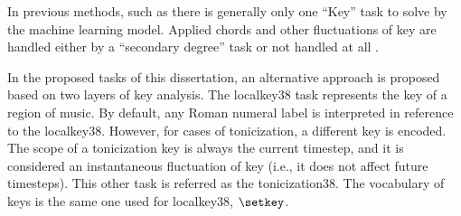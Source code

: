 
In previous methods, such as \textcite{chen2018functional,
chen2019harmony, micchi2020not, micchi2021deep,
mcleod2021modular} there is generally only one ``Key'' task
to solve by the machine learning model. Applied chords and
other fluctuations of key are handled either by a
``secondary degree'' task \parencite{chen2021attend,
micchi2021deep} or not handled at all
\parencite{mcleod2021modular}.

In the proposed tasks of this dissertation, an alternative
approach is proposed based on two layers of key analysis.
The \gls{localkey38} task represents the key of a region of
music. By default, any Roman numeral label is interpreted in
reference to the \gls{localkey38}. However, for cases of
tonicization, a different key is encoded. The scope of a
tonicization key is always the current timestep, and it is
considered an instantaneous fluctuation of key (i.e., it
does not affect future timesteps). This other task is
referred as the \gls{tonicization38}. The vocabulary of keys
is the same one used for \gls{localkey38}, $\setkey$.
